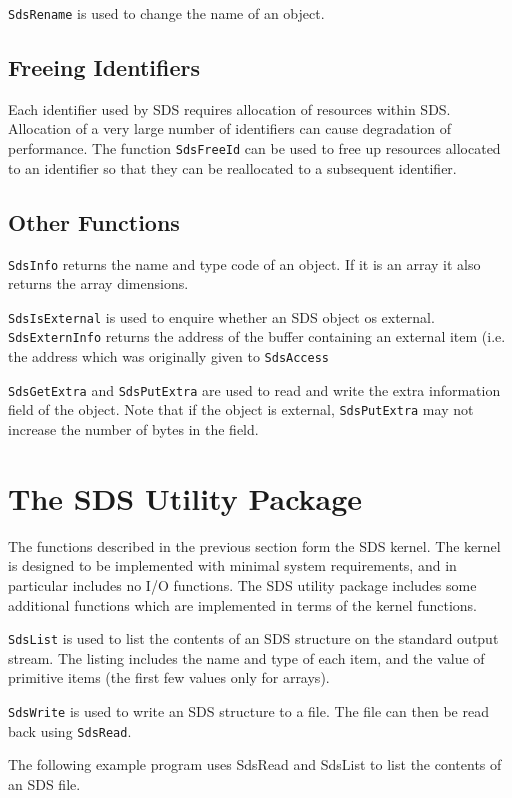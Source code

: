 \verb$SdsRename$ is used to change the name of an object.

\subsection{Freeing Identifiers}

Each identifier used by SDS requires allocation of resources within SDS.
Allocation of a very large number of identifiers can cause degradation of
performance. The function \verb$SdsFreeId$ can be used to free up resources allocated
to an identifier so that they can be reallocated to a subsequent identifier.

\subsection{Other Functions}

\verb$SdsInfo$ returns the name and type code of an object. If it is an array
it also returns the array dimensions.

\verb$SdsIsExternal$ is used to enquire whether an SDS object os external.
\verb$SdsExternInfo$ returns the address of the buffer containing an
external item (i.e. the address which was originally given to \verb$SdsAccess$

\verb$SdsGetExtra$ and \verb$SdsPutExtra$ are used to read and write the extra
information field of the object. Note that if the object is external,
\verb$SdsPutExtra$ may not increase the number of bytes in the field.

\section{The SDS Utility Package}

The functions described in the previous section form the SDS kernel. The kernel
is designed to be implemented with minimal system requirements, and in
particular includes no I/O functions. The SDS utility package includes some
additional functions which are implemented in terms of the kernel functions.

\verb$SdsList$ is used to list the contents of an SDS structure on the standard
output stream. The listing includes the name and type of each item, and the
value of primitive items (the first few values only for arrays).

\verb$SdsWrite$ is used to write an SDS structure to a file. The file can then
be read back using \verb$SdsRead$.

The following example program uses SdsRead and SdsList to list the contents of
an SDS file.

